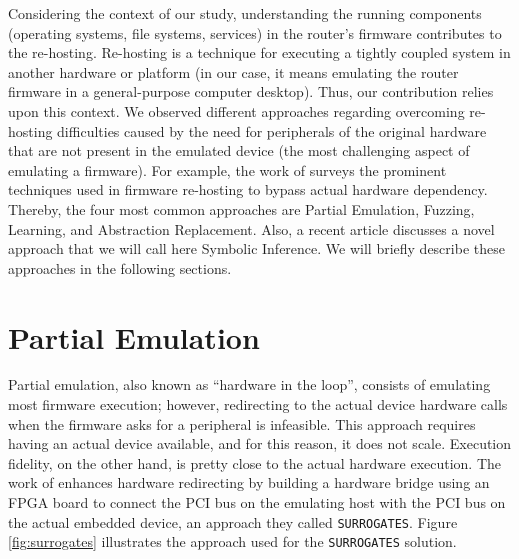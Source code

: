 Considering the context of our study, understanding the running components (operating systems, file systems, services) in the router's firmware contributes to the re-hosting.  Re-hosting is a technique for executing a tightly coupled system in another hardware or platform (in our case, it means emulating the router firmware in a general-purpose computer desktop).  Thus, our contribution relies upon this context.  We observed different approaches regarding overcoming re-hosting difficulties caused by the need for peripherals of the original hardware that are not present in the emulated device (the most challenging aspect of emulating a firmware). For example, the work of \cite{firmware-challenges} surveys the prominent techniques used in firmware re-hosting to bypass actual hardware dependency. Thereby, the four most common approaches are Partial Emulation, Fuzzing, Learning, and Abstraction Replacement. Also, a recent article discusses a novel approach that we will call here Symbolic Inference. We will briefly describe these approaches in the following sections.

\section{Partial Emulation}

Partial emulation, also known as ``hardware in the loop'', consists of emulating most firmware execution; however, redirecting to the actual device hardware calls when the firmware asks for a peripheral is infeasible. This approach requires having an actual device available, and for this reason, it does not scale. Execution fidelity, on the other hand, is pretty close to the actual hardware execution. The work of \cite{surrogates} enhances hardware redirecting by building a hardware bridge using an FPGA board to connect the PCI bus on the emulating host with the PCI bus on the actual embedded device, an approach they called {\tt SURROGATES}. Figure \ref{fig:surrogates} illustrates the approach used for the {\tt SURROGATES} solution.

